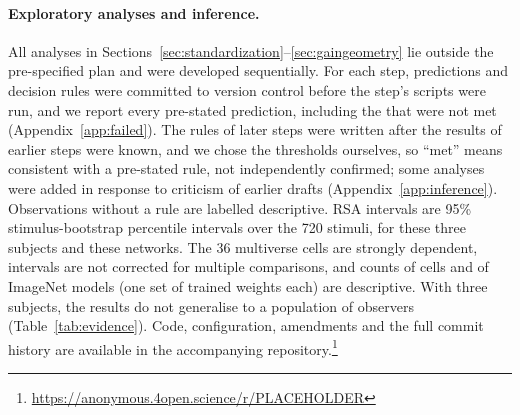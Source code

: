 \paragraph{Exploratory analyses and inference.}
All analyses in Sections~\ref{sec:standardization}--\ref{sec:gaingeometry} lie outside the
pre-specified plan and were developed sequentially. For each step, predictions and decision rules
were committed to version control before the step's scripts were run, and we report every
pre-stated prediction, including the \FailedPredictions{} that were not met
(Appendix~\ref{app:failed}). The rules of later steps were written after the results of earlier
steps were known, and we chose the thresholds ourselves, so ``met'' means consistent with a
pre-stated rule, not independently confirmed; some analyses were added in response to criticism of
earlier drafts (Appendix~\ref{app:inference}). Observations without a rule are labelled
descriptive. RSA intervals are 95\% stimulus-bootstrap percentile intervals over the 720 stimuli,
for these three subjects and these networks. The 36 multiverse cells are
strongly dependent, intervals are not corrected for multiple comparisons, and counts of cells and
of ImageNet models (one set of trained weights each) are descriptive. With three subjects, the
results do not generalise to a population of observers (Table~\ref{tab:evidence}). Code,
configuration, amendments and the full commit history are available in the accompanying
repository.\footnote{\url{https://anonymous.4open.science/r/PLACEHOLDER}}
